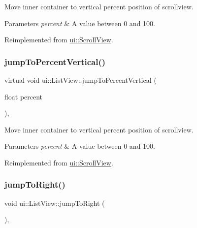 Move inner container to vertical percent position of scrollview. 
\begin{DoxyParams}{Parameters}
{\em percent} & A value between 0 and 100. \\
\hline
\end{DoxyParams}


Reimplemented from \hyperlink{classui_1_1ScrollView_a64f1cc13581ea0173bf708bb10198c2f}{ui\+::\+Scroll\+View}.

\mbox{\label{classui_1_1ListView_a0c76de2de006a8e9eea7225df545622e}} 
\subsubsection{\texorpdfstring{jump\+To\+Percent\+Vertical()}{jumpToPercentVertical()}\hspace{0.1cm}{\footnotesize\ttfamily [2/2]}}
{\footnotesize\ttfamily virtual void ui\+::\+List\+View\+::jump\+To\+Percent\+Vertical (\begin{DoxyParamCaption}\item[{float}]{percent }\end{DoxyParamCaption})\hspace{0.3cm}{\ttfamily [override]}, {\ttfamily [virtual]}}

Move inner container to vertical percent position of scrollview. 
\begin{DoxyParams}{Parameters}
{\em percent} & A value between 0 and 100. \\
\hline
\end{DoxyParams}


Reimplemented from \hyperlink{classui_1_1ScrollView_a64f1cc13581ea0173bf708bb10198c2f}{ui\+::\+Scroll\+View}.

\mbox{\label{classui_1_1ListView_a07a1265c424478b68dc7d691bd29dc85}} 
\subsubsection{\texorpdfstring{jump\+To\+Right()}{jumpToRight()}\hspace{0.1cm}{\footnotesize\ttfamily [1/2]}}
{\footnotesize\ttfamily void ui\+::\+List\+View\+::jump\+To\+Right (\begin{DoxyParamCaption}{ }\end{DoxyParamCaption})\hspace{0.3cm}{\ttfamily [override]}, {\ttfamily [virtual]}}


